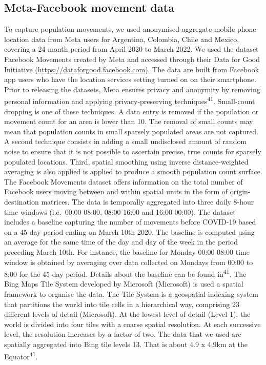 \documentclass[
  11pt,
]{article}
\begin{document}
\hypertarget{meta-facebook-movement-data}{%
\subsection{Meta-Facebook movement
data}\label{meta-facebook-movement-data}}

To capture population movements, we used anonymised aggregate mobile
phone location data from Meta users for Argentina, Colombia, Chile and
Mexico, covering a 24-month period from April 2020 to March 2022. We
used the dataset Facebook Movements created by Meta and accessed through
their Data for Good Initiative (\url{https://dataforgood.facebook.com}).
The data are built from Facebook app users who have the location
services setting turned on on their smartphone. Prior to releasing the
datasets, Meta ensures privacy and anonymity by removing personal
information and applying privacy-preserving
techniques\textsuperscript{41}. Small-count dropping is one of these
techniques. A data entry is removed if the population or movement count
for an area is lower than 10. The removal of small counts may mean that
population counts in small sparsely populated areas are not captured. A
second technique consists in adding a small undisclosed amount of random
noise to ensure that it is not possible to ascertain precise, true
counts for sparsely populated locations. Third, spatial smoothing using
inverse distance-weighted averaging is also applied is applied to
produce a smooth population count surface. The Facebook Movements
dataset offers information on the total number of Facebook users moving
between and within spatial units in the form of origin-destination
matrices. The data is temporally aggregated into three daily 8-hour time
windows (i.e.~00:00-08:00, 08:00-16:00 and 16:00-00:00). The dataset
includes a baseline capturing the number of movements before COVID-19
based on a 45-day period ending on March 10th 2020. The baseline is
computed using an average for the same time of the day and day of the
week in the period preceding March 10th. For instance, the baseline for
Monday 00:00-08:00 time window is obtained by averaging over data
collected on Mondays from 00:00 to 8:00 for the 45-day period. Details
about the baseline can be found in\textsuperscript{41}. The Bing Maps
Tile System developed by Microsoft (Microsoft) is used a spatial
framework to organise the data. The Tile System is a geospatial indexing
system that partitions the world into tile cells in a hierarchical way,
comprising 23 different levels of detail (Microsoft). At the lowest
level of detail (Level 1), the world is divided into four tiles with a
coarse spatial resolution. At each successive level, the resolution
increases by a factor of two. The data that we used are spatially
aggregated into Bing tile levels 13. That is about 4.9 x 4.9km at the
Equator\textsuperscript{41}.
\end{document}
